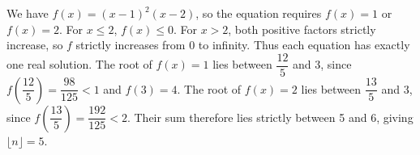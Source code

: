 We have $f(x)=(x-1)^2(x-2)$, so the equation requires $f(x)=1$ or $f(x)=2$. For $x\le2$, $f(x)\le0$. For $x>2$, both positive factors strictly increase, so $f$ strictly increases from 0 to infinity. Thus each equation has exactly one real solution. The root of $f(x)=1$ lies between $\dfrac{12}{5}$ and 3, since $f(\dfrac{12}{5})=\dfrac{98}{125}<1$ and $f(3)=4$. The root of $f(x)=2$ lies between $\dfrac{13}{5}$ and 3, since $f(\dfrac{13}{5})=\dfrac{192}{125}<2$. Their sum therefore lies strictly between 5 and 6, giving $\boxed{\lfloor n\rfloor=5}$.

